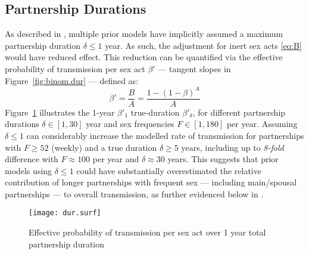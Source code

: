 \subsection{Partnership Durations}\label{foi.exp.dur}
As described in , multiple prior models have
implicitly assumed a maximum partnership duration $\delta \le 1$ year.
As such, the adjustment for inert sex acts \eqref{eq:B} would have reduced effect.
This reduction can be quantified via
the effective probability of transmission per sex act $\beta'$
--- \ie tangent slopes in Figure~\ref{fig:binom.dur} --- defined as:
\begin{equation}\label{eq:beta.eff}
  \beta' = \frac{B}{A} = \frac{1 - {(1 - \beta)}^{A}}{A}
\end{equation}
Figure~\ref{fig:dur.surf} illustrates
the 1-year $\beta'_1$ \vs true-duration $\beta'_\delta$, for different
partnership durations $\delta \in [1, 30]$ year and
sex frequencies $F \in [1,180]$ per year.
Assuming $\delta \le 1$ can considerably increase the modelled rate of transmission
for partnerships with $F \ge 52$ (\ie weekly) and a true duration $\delta \ge 5$ years,
including up to \emph{8-fold} difference with
$F \approx 100$ per year and $\delta \approx 30$ years.
This suggests that prior models using $\delta \le 1$ could have
substantially overestimated the relative contribution of
longer partnerships with frequent sex --- including main/spousal partnerships ---
to overall transmission, as further evidenced below in .
\begin{figure}
  \centering\texttt{[image: dur.surf]}
  \caption{Effective probability of transmission per sex act
    over 1 year \vs total partnership duration}
  \label{fig:dur.surf}
\end{figure}
